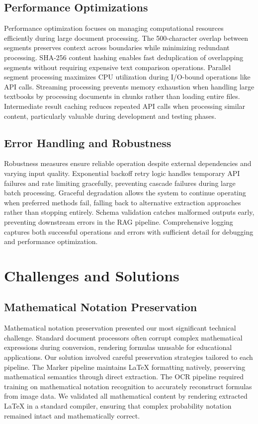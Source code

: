 \documentclass[12pt]{article}
\begin{document}
\subsection{Performance Optimizations}

Performance optimization focuses on managing computational resources efficiently during large document processing. The 500-character overlap between segments preserves context across boundaries while minimizing redundant processing. SHA-256 content hashing enables fast deduplication of overlapping segments without requiring expensive text comparison operations. Parallel segment processing maximizes CPU utilization during I/O-bound operations like API calls. Streaming processing prevents memory exhaustion when handling large textbooks by processing documents in chunks rather than loading entire files. Intermediate result caching reduces repeated API calls when processing similar content, particularly valuable during development and testing phases.

\subsection{Error Handling and Robustness}

Robustness measures ensure reliable operation despite external dependencies and varying input quality. Exponential backoff retry logic handles temporary API failures and rate limiting gracefully, preventing cascade failures during large batch processing. Graceful degradation allows the system to continue operating when preferred methods fail, falling back to alternative extraction approaches rather than stopping entirely. Schema validation catches malformed outputs early, preventing downstream errors in the RAG pipeline. Comprehensive logging captures both successful operations and errors with sufficient detail for debugging and performance optimization.

\section{Challenges and Solutions}

\subsection{Mathematical Notation Preservation}

Mathematical notation preservation presented our most significant technical challenge. Standard document processors often corrupt complex mathematical expressions during conversion, rendering formulas unusable for educational applications. Our solution involved careful preservation strategies tailored to each pipeline. The Marker pipeline maintains LaTeX formatting natively, preserving mathematical semantics through direct extraction. The OCR pipeline required training on mathematical notation recognition to accurately reconstruct formulas from image data. We validated all mathematical content by rendering extracted LaTeX in a standard compiler, ensuring that complex probability notation remained intact and mathematically correct.
\end{document}
